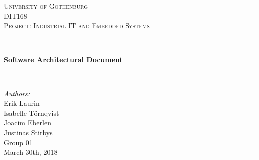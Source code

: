 \documentclass[12pt]{article}
\begin{document}
\begin{titlepage}

\newcommand{\Line}{\rule{\linewidth}{0.5mm}} 

\center
 
\textsc{\LARGE University of Gothenburg}
\\[3.5cm] 

\textsc{\Large DIT168}\\[0.3cm]
\textsc{\large Project: Industrial IT and Embedded Systems}\\[0.5cm]

\Line \\[0.4cm]
{\huge \bfseries Software Architectural Document}\\[0.4cm]
\Line \\[0.5cm]
 
\Large \textit{Authors:}
\\Erik Laurin
\\Isabelle Törnqvist
\\Joacim Eberlen
\\Justinas Stirbys \\[4cm]

{\large Group 01} \\[0.3cm]
{\large March 30th, 2018}

\vfill

\end{titlepage}

\tableofcontents
\pagebreak

\end{document}
